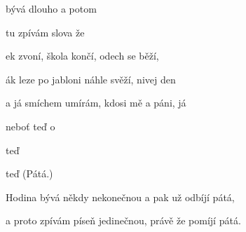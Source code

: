 
\zs
{} bývá dlouho  a potom  

 tu zpívám slova  že  
\ks

\zr
{}ek zvoní, škola končí, odech se běží,

ák leze po jabloni  náhle svěží, nivej den

a já smíchem umírám, kdosi mě  a páni, já 

neboť   teď o

  teď 

  teď   (Pátá.)
\kr

\zs
Hodina bývá někdy nekonečnou a pak už odbíjí pátá,

a proto zpívám píseň jedinečnou, právě že pomíjí pátá.
\ks


\zr \kr

\kp





